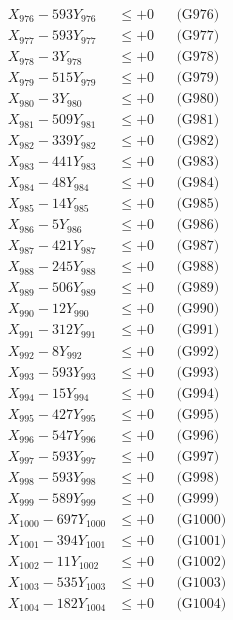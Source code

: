 \documentclass[a4paper,10pt]{article}
\begin{document}
{\begin{align}
X_{976} - 593Y_{976} &\leq +0 && \text{(G976)} \\
X_{977} - 593Y_{977} &\leq +0 && \text{(G977)} \\
X_{978} - 3Y_{978} &\leq +0 && \text{(G978)} \\
X_{979} - 515Y_{979} &\leq +0 && \text{(G979)} \\
X_{980} - 3Y_{980} &\leq +0 && \text{(G980)} \\
\allowbreak
X_{981} - 509Y_{981} &\leq +0 && \text{(G981)} \\
X_{982} - 339Y_{982} &\leq +0 && \text{(G982)} \\
X_{983} - 441Y_{983} &\leq +0 && \text{(G983)} \\
X_{984} - 48Y_{984} &\leq +0 && \text{(G984)} \\
X_{985} - 14Y_{985} &\leq +0 && \text{(G985)} \\
X_{986} - 5Y_{986} &\leq +0 && \text{(G986)} \\
X_{987} - 421Y_{987} &\leq +0 && \text{(G987)} \\
X_{988} - 245Y_{988} &\leq +0 && \text{(G988)} \\
X_{989} - 506Y_{989} &\leq +0 && \text{(G989)} \\
X_{990} - 12Y_{990} &\leq +0 && \text{(G990)} \\
\allowbreak
X_{991} - 312Y_{991} &\leq +0 && \text{(G991)} \\
X_{992} - 8Y_{992} &\leq +0 && \text{(G992)} \\
X_{993} - 593Y_{993} &\leq +0 && \text{(G993)} \\
X_{994} - 15Y_{994} &\leq +0 && \text{(G994)} \\
X_{995} - 427Y_{995} &\leq +0 && \text{(G995)} \\
X_{996} - 547Y_{996} &\leq +0 && \text{(G996)} \\
X_{997} - 593Y_{997} &\leq +0 && \text{(G997)} \\
X_{998} - 593Y_{998} &\leq +0 && \text{(G998)} \\
X_{999} - 589Y_{999} &\leq +0 && \text{(G999)} \\
X_{1000} - 697Y_{1000} &\leq +0 && \text{(G1000)} \\
\allowbreak
X_{1001} - 394Y_{1001} &\leq +0 && \text{(G1001)} \\
X_{1002} - 11Y_{1002} &\leq +0 && \text{(G1002)} \\
X_{1003} - 535Y_{1003} &\leq +0 && \text{(G1003)} \\
X_{1004} - 182Y_{1004} &\leq +0 && \text{(G1004)} \\

\end{align}}
\end{document}
